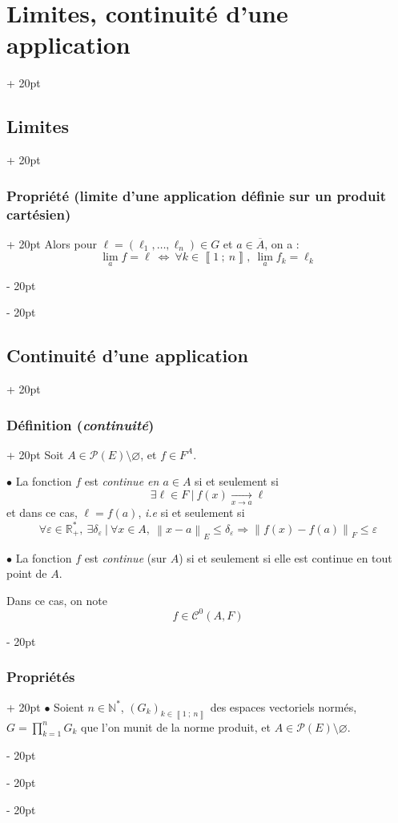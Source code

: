 \documentclass[a4paper, 12pt, twoside]{article}
\newcommand{\N}{\mathbb{N}} %
\newcommand{\R}{\mathbb{R}} %
\newcommand{\nset}[2]{\left\llbracket #1\ ;\ #2 \right\rrbracket}
\newcommand{\cj}[1]{\overline{#1}} %
\newcommand{\tendsto}[1]{\xrightarrow[#1]{}}
\newcommand{\norm}[1]{\left\lVert #1 \right\rVert}
\newcommand{\ssi}{\ \Leftrightarrow \ }
\renewcommand{\le}{\leqslant}
\newcommand{\ind}[1][20pt]{\advance\leftskip + #1}
\newcommand{\deind}[1][20pt]{\advance\leftskip - #1}
\newenvironment{indt}[2][20pt]{#2 \par \ind[#1]}{\par \deind} %
\begin{document}
\begin{indt}{\section{Limites, continuité d'une application}}
\begin{indt}{\subsection{Limites}}
\begin{indt}{\subsubsection{Propriété (limite d'une application définie sur un produit cartésien)}}
                Alors pour $\ell = (\ell_1, \ldots, \ell_n) \in G$ et $a \in \cj A$, on a :
                \[
                    \lim_a f = \ell
                    \ssi
                    \forall k \in \nset 1 n,\
                    \lim_a f_k = \ell_k
                \]
            \end{indt}
        \end{indt}

        \vspace{12pt}
        
        \begin{indt}{\subsection{Continuité d'une application}}
            \begin{indt}{\subsubsection{Définition (\textit{continuité})}}
                Soit $A \in \mathcal P(E) \setminus \varnothing$, et $f \in F^A$.

                \vspace{6pt}
                
                $\bullet$ La fonction $f$ est \emph{continue en $a \in A$} si et seulement si
                \[
                    \exists \ell \in F\ |\ f(x) \tendsto{x \to a} \ell
                \]
                et dans ce cas, $\ell = f(a)$, \textit{i.e} si et seulement si
                \[
                    \forall \varepsilon \in \R^*_+,\
                    \exists \delta_\varepsilon\ |\
                    \forall x \in A,\
                    \norm{x - a}_E \le \delta_\varepsilon \Rightarrow \norm{f(x) - f(a)}_F \le \varepsilon
                \]

                \vspace{6pt}
                
                $\bullet$ La fonction $f$ est \emph{continue} (sur $A$) si et seulement si elle est continue en tout point de $A$.

                Dans ce cas, on note
                \[
                    f \in \mathcal C^0(A, F)
                \]
            \end{indt}

            \vspace{12pt}
            
            \begin{indt}{\subsubsection{Propriétés}}
                $\bullet$ Soient $n \in \N^*$, $(G_k)_{k \in \nset 1 n}$ des espaces vectoriels normés, $\displaystyle G = \prod_{k = 1}^n G_k$ que l'on munit de la norme produit, et $A \in \mathcal P(E) \setminus \varnothing$.


\end{indt}
\end{indt}
\end{indt}
\end{document}
